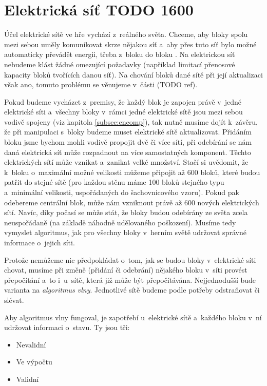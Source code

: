

\section{Elektrická síť TODO 1600}
\label{sec:energyNet}
Účel elektrické sítě ve hře vychází z~reálného světa. Chceme, aby bloky spolu mezi sebou uměly komunikovat skrze nějakou síť a~aby přes tuto síť bylo možné automaticky převádět energii, třeba z~bloku  do bloku . Na elektrickou síť nebudeme klást žádné omezující požadavky (například limitací přenosové kapacity bloků tvořících danou síť). Na chování bloků dané sítě při její aktualizaci však ano, tomuto problému se věnujeme v~části (TODO ref).

Pokud budeme vycházet z~premisy, že každý blok je zapojen právě v~jedné elektrické síti a~všechny bloky v~rámci jedné elektrické sítě jsou mezi sebou vodivě spojeny (viz kapitola \ref{subsec:encomp}), tak nutně musíme dojít k~závěru, že při manipulaci s~bloky budeme muset elektrické sítě aktualizovat. Přidáním bloku jsme bychom mohli vodivě propojit dvě či více sítí, při odebírání se nám daná elektrická síť může rozpadnout na více samostatných komponent. Těchto elektrických sítí může vznikat a~zanikat velké množství. Stačí si uvědomit, že k~bloku  o~maximální možné velikosti můžeme připojit až 600 bloků, které budou patřit do stejné sítě (pro každou stěnu máme 100 bloků stejného typu a~minimální velikosti, uspořádaných do šachovnicového vzoru). Pokud pak odebereme centrální blok, může nám vzniknout právě až 600 nových elektrických sítí. Navíc, díky počasí se může stát, že bloky budou odebírány ze světa zcela neuspořádaně (na základě náhodně udělovaného poškození). Musíme tedy vymyslet algoritmus, jak pro všechny bloky v~herním světě udržovat správné informace o~jejich síti.

Protože nemůžeme nic předpokládat o~tom, jak se budou bloky v~elektrické síti chovat, musíme při změně (přidání či odebrání) nějakého bloku v~síti provést přepočítání a~to i~u~sítě, která již může být přepočítávána. Nejjednodušší bude varianta na \textit{algoritmus vlny}. Jednotlivé sítě budeme podle potřeby odstraňovat či slévat. 

Aby algoritmus vlny fungoval, je zapotřebí u~elektrické sítě a~každého bloku v~ní udržovat informaci o~stavu. Ty jsou tři:
\begin{itemize}
	\item Nevalidní
	\item Ve výpočtu
	\item Validní
\end{itemize}

